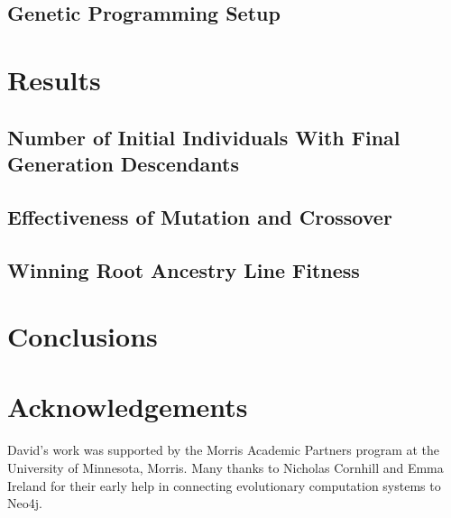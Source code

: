 \documentclass[12pt]{article}
\begin{document}
\subsection{Genetic Programming Setup}
\label{sec:GPSetup}


\section{Results} \label{sec:results}



\subsection{Number of Initial Individuals With Final Generation Descendants}
\label{sec:numberInitialIndividualsWithDescendants}



\subsection{Effectiveness of Mutation and Crossover}
\label{sec:effectivenessMutationCrossover}



\subsection{Winning Root Ancestry Line Fitness}
\label{sec:WinningRootLineFitness}


\section{Conclusions} \label{sec:conclusion}



\section*{Acknowledgements}

David's work was supported by the Morris Academic Partners program at the University of Minnesota, Morris. Many thanks to Nicholas Cornhill and Emma Ireland for their early help in connecting evolutionary computation systems to Neo4j.

\pagebreak



\end{document}
